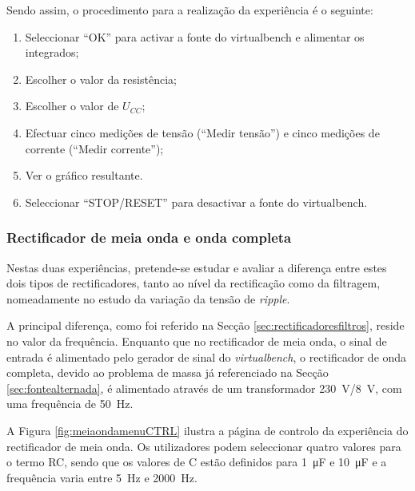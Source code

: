 Sendo assim, o procedimento para a realização da experiência é o seguinte:
\begin{enumerate}
	\item Seleccionar ``OK'' para activar a fonte do \acrshort{virtualbench} e alimentar os integrados;
	\item Escolher o valor da resistência;
	\item Escolher o valor de $U_{CC}$;
	\item Efectuar cinco medições de tensão (``Medir tensão'') e cinco medições de corrente (``Medir corrente'');
	\item Ver o gráfico resultante.
	\item Seleccionar ``STOP/RESET'' para desactivar a fonte do \acrshort{virtualbench}.
\end{enumerate}

\subsubsection{Rectificador de meia onda e onda completa}
\label{sec:rectificadores}
Nestas duas experiências, pretende-se estudar e avaliar a diferença entre estes dois tipos de rectificadores, tanto ao nível da rectificação como da filtragem, nomeadamente no estudo da variação da tensão de \textit{ripple}.

A principal diferença, como foi referido na Secção \ref{sec:rectificadoresfiltros}, reside no valor da frequência. Enquanto que no rectificador de meia onda, o sinal de entrada é alimentado pelo gerador de sinal do \textit{virtualbench}, o rectificador de onda completa, devido ao problema de massa já referenciado na Secção \ref{sec:fontealternada}, é alimentado através de um transformador \SI{230}{\volt}/\SI{8}{\volt}, com uma frequência de \SI{50}{\hertz}.

A Figura \ref{fig:meiaondamenuCTRL} ilustra a página de controlo da experiência do rectificador de meia onda. Os utilizadores podem seleccionar quatro valores para o termo RC, sendo que os valores de C estão definidos para \SI{1}{\micro\farad} e \SI{10}{\micro\farad} e a frequência varia entre \SI{5}{\hertz} e \SI{2000}{\hertz}. 

